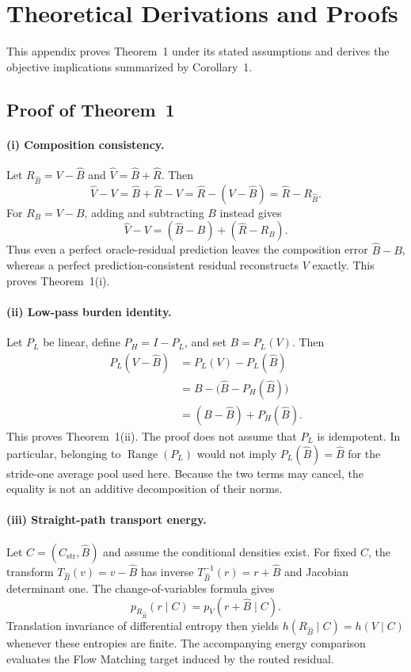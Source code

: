 \section{Theoretical Derivations and Proofs}
\label{app:residual-proofs}
This appendix proves Theorem~1 under its stated assumptions and derives the objective implications summarized by Corollary~1.

\subsection{Proof of Theorem~1}
\paragraph{(i) Composition consistency.}
Let $R_{\hat B}=V-\hat B$ and $\hat V=\hat B+\hat R$. Then
\begin{equation}
\hat V-V=\hat B+\hat R-V=\hat R-(V-\hat B)=\hat R-R_{\hat B}.
\end{equation}
For $R_B=V-B$, adding and subtracting $B$ instead gives
\begin{equation}
\hat V-V=(\hat B-B)+(\hat R-R_B).
\end{equation}
Thus even a perfect oracle-residual prediction leaves the composition error $\hat B-B$, whereas a perfect prediction-consistent residual reconstructs $V$ exactly. This proves Theorem~1(i).

\paragraph{(ii) Low-pass burden identity.}
Let $P_L$ be linear, define $P_H=I-P_L$, and set $B=P_L(V)$. Then
\begin{align}
P_L(V-\hat B)
&=P_L(V)-P_L(\hat B)\\
&=B-\bigl(\hat B-P_H(\hat B)\bigr)\\
&=(B-\hat B)+P_H(\hat B).
\end{align}
This proves Theorem~1(ii). The proof does not assume that $P_L$ is idempotent. In particular, belonging to $\operatorname{Range}(P_L)$ would not imply $P_L(\hat B)=\hat B$ for the stride-one average pool used here. Because the two terms may cancel, the equality is not an additive decomposition of their norms.

\paragraph{(iii) Straight-path transport energy.}
Let $C=(C_{\mathrm{str}},\hat B)$ and assume the conditional densities exist. For fixed $C$, the transform $T_{\hat B}(v)=v-\hat B$ has inverse $T_{\hat B}^{-1}(r)=r+\hat B$ and Jacobian determinant one. The change-of-variables formula gives
\begin{equation}
p_{R_{\hat B}}(r\mid C)=p_V(r+\hat B\mid C).
\end{equation}
Translation invariance of differential entropy then yields $h(R_{\hat B}\mid C)=h(V\mid C)$ whenever these entropies are finite. The accompanying energy comparison evaluates the Flow Matching target induced by the routed residual.

